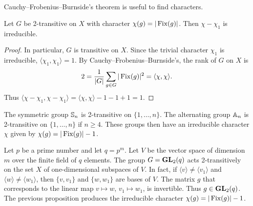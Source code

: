 \chapter{}

Cauchy--Frobenius--Burnside's theorem is useful to
find characters. 

\begin{proposition}
    Let $G$ be 2-transitive on $X$ with character $\chi(g)=|\operatorname{Fix}(g)|$.
    Then $\chi-\chi_1$ is irreducible. 
\end{proposition}

\begin{proof}
    In particular, $G$ is transitive on $X$. 
    Since the trivial character $\chi_1$ is irreducible, $\langle\chi_1,\chi_1\rangle=1$. 
    By Cauchy--Frobenius--Burnside's, the rank of $G$ on $X$ is  
    \begin{gather*}
        2=\frac{1}{|G|}\sum_{g\in G}|\operatorname{Fix}(g)|^2=\langle \chi,\chi\rangle.
   \end{gather*}
   Thus $\langle \chi-\chi_1,\chi-\chi_1\rangle=\langle\chi,\chi\rangle-1-1+1=1$.
\end{proof}

\begin{example}
    The symmetric group $\mathbb{S}_n$ is 2-transitive on $\{1,\dots,n\}$. The
    alternating group $\mathbb{A}_n$ is 2-transitive on $\{1,\dots,n\}$ if 
    $n\geq4$. These groups then have an irreducible character $\chi$ 
    given by $\chi(g)=|\operatorname{Fix}(g)|-1$.
\end{example}

\begin{example}
    Let $p$ be a prime number and let $q=p^{m}$. Let $V$ 
    be the vector space of dimension $m$ 
    over the finite field of $q$ elements. 
    The group $G=\mathbf{GL}_2(q)$ acts 2-transitively on the set $X$ of
    one-dimensional subspaces of $V$. In fact, 
    if $\langle v\rangle\ne\langle v_1\rangle$ and $\langle w\rangle\ne\langle w_1\rangle$, 
    then $\{v,v_1\}$ and $\{w,w_1\}$ are bases of $V$. 
    The matrix $g$ that corresponds to the linear map 
    $v\mapsto w$, $v_1\mapsto w_1$, is invertible. Thus $g\in\mathbf{GL}_2(q)$. 
    The previous proposition produces the irreducible character
    $\chi(g)=|\operatorname{Fix}(g)|-1$. 
\end{example}

